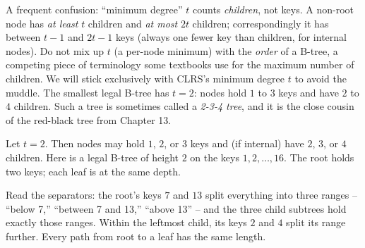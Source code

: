 \begin{trapbox}
A frequent confusion: ``minimum degree'' $t$ counts \emph{children}, not keys. A
non-root node has \emph{at least} $t$ children and \emph{at most} $2t$ children;
correspondingly it has between $t-1$ and $2t-1$ keys (always one fewer key than
children, for internal nodes). Do not mix up $t$ (a per-node minimum) with the
\emph{order} of a B-tree, a competing piece of terminology some textbooks use for
the maximum number of children. We will stick exclusively with CLRS's minimum
degree $t$ to avoid the muddle. The smallest legal B-tree has $t=2$: nodes hold
$1$ to $3$ keys and have $2$ to $4$ children. Such a tree is sometimes called a
\emph{2-3-4 tree}, and it is the close cousin of the red-black tree from
Chapter 13.
\end{trapbox}

\begin{example}\label{ch18:ex-small-tree}
Let $t = 2$. Then nodes may hold $1$, $2$, or $3$ keys and (if internal) have $2$,
$3$, or $4$ children. Here is a legal B-tree of height $2$ on the keys
$1,2,\ldots,16$. The root holds two keys; each leaf is at the same depth.

\begin{center}
\end{center}

Read the separators: the root's keys $7$ and $13$ split everything into three
ranges -- ``below 7,'' ``between 7 and 13,'' ``above 13'' -- and the three child
subtrees hold exactly those ranges. Within the leftmost child, its keys $2$ and
$4$ split its range further. Every path from root to a leaf has the same length.
\end{example}

